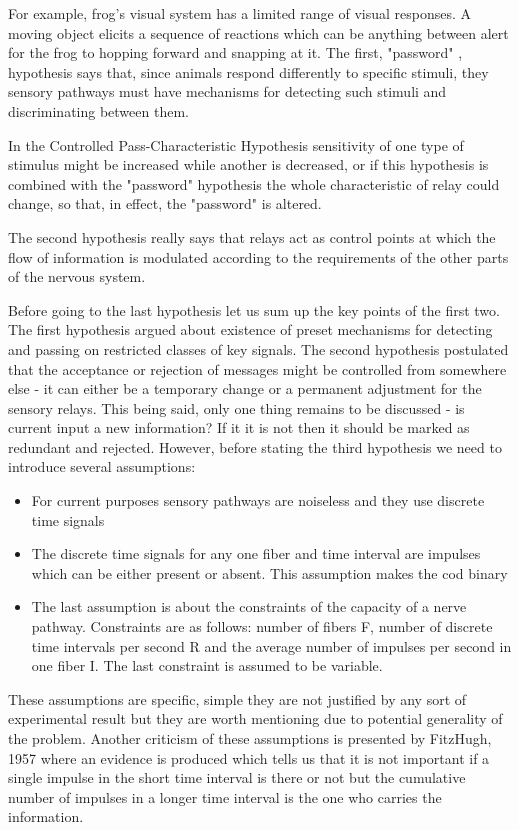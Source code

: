 \documentclass[twoside]{article}
\begin{document}
\begin{multicols}{2}
For example, frog's visual system has a limited range of visual responses. A moving object elicits a sequence of reactions which can be anything between alert for the frog to hopping forward and snapping at it. 
The first, "password" , hypothesis says that, since animals respond differently to specific stimuli, they sensory pathways must have mechanisms for detecting such stimuli and discriminating between them. 

In the Controlled Pass-Characteristic Hypothesis sensitivity of one type of stimulus might be increased while another is decreased, or if this hypothesis is combined with the "password" hypothesis the whole characteristic of relay could change, so that, in effect, the "password" is altered. 

The second hypothesis really says that relays act as control points at which the flow of information is modulated according to the requirements of the other parts of the nervous system.

Before going to the last hypothesis let us sum up the key points of the first two. The first hypothesis argued about existence of preset mechanisms for detecting and passing on restricted classes of key signals. The second hypothesis postulated that the acceptance or rejection of messages might be controlled from somewhere else - it can either be a temporary change or a permanent adjustment for the sensory relays. This being said, only one thing remains to be discussed - is current input a new information? If it it is not then it should be marked as redundant and rejected. However, before stating the third hypothesis we need to introduce several assumptions:

\begin{itemize}
\item For current purposes sensory pathways are noiseless and they use discrete time signals
\item The discrete time signals for any one fiber and time interval are impulses which can be either present or absent. This assumption makes the cod binary
\item The last assumption is about the constraints of the capacity of a nerve pathway. Constraints are as follows: number of fibers F, number of discrete time intervals per second R and the average number of impulses per second in one fiber I. The last constraint is assumed to be variable. 
\end{itemize}
These assumptions are specific, simple they are not justified by any sort of experimental result but they are worth mentioning due to potential generality of the problem. Another criticism of these assumptions is presented by FitzHugh, 1957 where an evidence is produced which tells us that it is not important if a single impulse in the short time interval is there or not but the cumulative  number of impulses in a longer time interval is the one who carries the information. 


\end{multicols}
\end{document}
